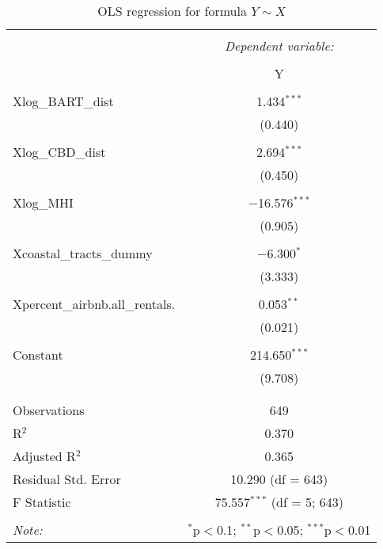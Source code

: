 \documentclass[10pt, letterpaper]{amsart}
\begin{document}
\begin{table}[!htbp] \centering 
  \caption{OLS regression for formula \(Y\sim X\)} 
  \label{} 
  \begin{tabular}{@{\extracolsep{5pt}}lc} 
    \\[-1.8ex]\hline 
    \hline \\[-1.8ex] 
    & \multicolumn{1}{c}{\textit{Dependent variable:}} \\ 
    \cline{2-2} 
    \\[-1.8ex] & Y \\ 
    \hline \\[-1.8ex] 
    Xlog\_BART\_dist & 1.434$^{***}$ \\ 
    & (0.440) \\ 
    & \\ 
    Xlog\_CBD\_dist & 2.694$^{***}$ \\ 
    & (0.450) \\ 
    & \\ 
    Xlog\_MHI & $-$16.576$^{***}$ \\ 
    & (0.905) \\ 
    & \\ 
    Xcoastal\_tracts\_dummy & $-$6.300$^{*}$ \\ 
    & (3.333) \\ 
    & \\ 
    Xpercent\_airbnb.all\_rentals. & 0.053$^{**}$ \\ 
    & (0.021) \\ 
    & \\ 
    Constant & 214.650$^{***}$ \\ 
    & (9.708) \\ 
    & \\ 
    \hline \\[-1.8ex] 
    Observations & 649 \\ 
    R$^{2}$ & 0.370 \\ 
    Adjusted R$^{2}$ & 0.365 \\ 
    Residual Std. Error & 10.290 (df = 643) \\ 
    F Statistic & 75.557$^{***}$ (df = 5; 643) \\ 
    \hline 
    \hline \\[-1.8ex] 
    \textit{Note:}  & \multicolumn{1}{r}{$^{*}$p$<$0.1; $^{**}$p$<$0.05; $^{***}$p$<$0.01} \\ 
  \end{tabular} 
\end{table} 
\end{document}
